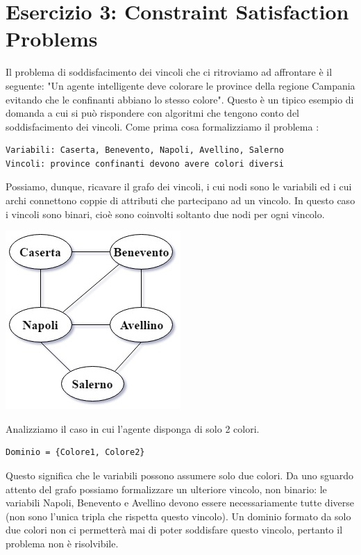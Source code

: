 	\section{Esercizio 3: Constraint Satisfaction Problems}
		\label{sec:es3}
		Il problema di soddisfacimento dei vincoli che ci ritroviamo ad affrontare è il seguente: "Un agente intelligente  deve colorare le province della regione Campania evitando che le confinanti abbiano lo stesso colore". Questo è un tipico esempio di domanda a cui si può rispondere con algoritmi che tengono conto del soddisfacimento dei vincoli. Come prima cosa formalizziamo il problema :
		\begin{lstlisting}
Variabili: Caserta, Benevento, Napoli, Avellino, Salerno
Vincoli: province confinanti devono avere colori diversi
		\end{lstlisting}
		Possiamo, dunque, ricavare il grafo dei vincoli, i cui nodi sono le variabili ed i cui archi connettono coppie di attributi che partecipano ad un vincolo. In questo caso i vincoli sono binari, cioè sono coinvolti soltanto due nodi per ogni vincolo.
		\begin{center}
			\includegraphics[scale=0.7]{ConstraintGraph.jpg}
		\end{center}
		Analizziamo il caso in cui l'agente disponga di solo 2 colori.
		\begin{lstlisting}
Dominio = {Colore1, Colore2}
		\end{lstlisting}
		Questo significa che le variabili possono assumere solo due colori.
		Da uno sguardo attento del grafo possiamo formalizzare un ulteriore vincolo, non binario: le variabili Napoli, Benevento e Avellino devono essere necessariamente tutte diverse (non sono l'unica tripla che rispetta questo vincolo).
		Un dominio formato da solo due colori non ci permetterà mai di poter soddisfare questo vincolo, pertanto il problema non è risolvibile. 

